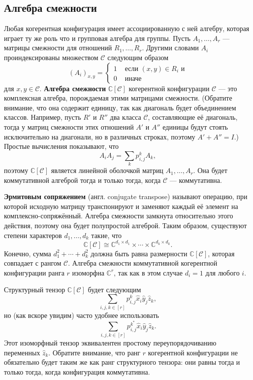\subsection{Алгебра смежности}\label{ssub:12:4.3}

Любая когерентная конфигурация имеет ассоциированную с ней алгебру, которая играет ту же роль что и групповая алгебра для группы. Пусть $A_1, \dotsc, A_r$ --- матрицы смежности для отношений $R_1, \dotsc, R_r$. Другими словами $A_i$ проиндексированы множеством $\mathscr{C}$ следующим образом
\[
	(A_i)_{x,y} =
	\begin{cases}
	  1 & \text{ если } (x,y) \in R_i \text{ и}\\
	  0 & \text{ иначе}
	\end{cases}
\]
для $x,y \in \mathscr{C}$. \textbf{Алгебра смежности} $\mathbb{C}[\mathscr{C}]$ когерентной конфигурации $\mathscr{C}$ --- это комплексная алгебра, порождаемая этими матрицами смежности. (Обратите внимание, что она содержит единицу, так как диагональ будет объединением классов. Например, пусть $R'$ и $R''$ два класса $\mathscr{C}$, составляющие её диагональ, тогда у матриц смежности этих отношений $A'$ и $A''$ единицы будут стоять исключительно на диагонали, но в различных строках, поэтому $A' + A'' = I$.) Простые вычисления показывают, что
\[
	A_i A_j = \sum_k p_{i,j}^k A_k,
\]
поэтому $\mathbb{C}[\mathscr{C}]$ является линейной оболочкой матриц $A_1, \dotsc, A_r$. Она будет коммутативной алгеброй тогда и только тогда, когда $\mathscr{C}$ --- коммутативна.

\textbf{Эрмитовым сопряжением} (англ. conjugate transpose) называют операцию, при которой исходную матрицу транспонируют и заменяют каждый её элемент на комплексно-сопряжённый. 
Алгебра смежности замкнута относительно этого действия, поэтому она будет полупростой алгеброй. Таким образом, существуют степени характеров $d_1, \dotsc, d_k$ такие, что
\[
	\mathbb{C}[\mathscr{C}] \cong \mathbb{C}^{d_1 \times d_1} \times \dotsb \times \mathbb{C}^{d_k \times d_k}.
\]
Конечно, сумма $d_1^2 + \dotsb + d_k^2$ должна быть равна размерности $\mathbb{C}[\mathscr{C}]$, которая совпадает с рангом $\mathscr{C}$. Алгебра смежности коммутативной когерентной конфигурации ранга $r$ изоморфна $\mathbb{C}^r$, так как в этом случае $d_i=1$ для любого $i$.

Структурный тензор $\mathbb{C}[\mathscr{C}]$ будет следующим 
\[
	\sum_{i,j,k \in [r]} p_{i,j}^k \widehat{x}_i \widehat{y}_j \widehat{z}_k,
\]
но (как вскоре увидим) часто удобнее использовать
\[
	\sum_{i,j,k \in [r]} p_{i,j}^{k^*} \widehat{x}_i \widehat{y}_j \widehat{z}_k.
\]
Этот изоморфный тензор эквивалентен простому переупорядочиванию переменных $\widehat{z}_k$. Обратите внимание, что ранг $r$ когерентной конфигурации не обязательно будет таким же как ранг структурного тензора: они равны тогда и только тогда, когда конфигурация коммутативна.

